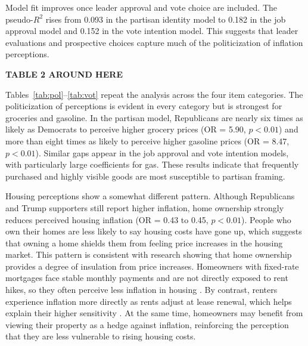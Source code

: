 \documentclass[]{interact}
\theoremstyle{plain}%
\theoremstyle{definition}
\theoremstyle{remark}
\begin{document}
Model fit improves once leader approval and vote choice are included. The pseudo-$R^2$ rises from 0.093 in the partisan identity model to 0.182 in the job approval model and 0.152 in the vote intention model. This suggests that leader evaluations and prospective choices capture much of the politicization of inflation perceptions.  



\begin{center}
\textbf{TABLE 2 AROUND HERE}
\end{center}

Tables~\ref{tab:pol}--\ref{tab:vot} repeat the analysis across the four item categories. The politicization of perceptions is evident in every category but is strongest for groceries and gasoline. In the partisan model, Republicans are nearly six times as likely as Democrats to perceive higher grocery prices (OR = 5.90, $p<0.01$) and more than eight times as likely to perceive higher gasoline prices (OR = 8.47, $p<0.01$). Similar gaps appear in the job approval and vote intention models, with particularly large coefficients for gas. These results indicate that frequently purchased and highly visible goods are most susceptible to partisan framing.  

Housing perceptions show a somewhat different pattern. Although Republicans and Trump supporters still report higher inflation, home ownership strongly reduces perceived housing inflation (OR = 0.43 to 0.45, $p<0.01$). People who own their homes are less likely to say housing costs have gone up, which suggests that owning a home shields them from feeling price increases in the housing market. This pattern is consistent with research showing that home ownership provides a degree of insulation from price increases. Homeowners with fixed-rate mortgages face stable monthly payments and are not directly exposed to rent hikes, so they often perceive less inflation in housing \citep{ahnEffectsMonetaryPolicy2024,piccoloHomeownershipAttentionInflation2025,dohHeterogeneityHouseholdInflation2025}. By contrast, renters experience inflation more directly as rents adjust at lease renewal, which helps explain their higher sensitivity \citep{koenigerTransmissionMonetaryPolicy2022, piccoloHomeownershipAttentionInflation2025}. At the same time, homeowners may benefit from viewing their property as a hedge against inflation, reinforcing the perception that they are less vulnerable to rising housing costs.
\end{document}
